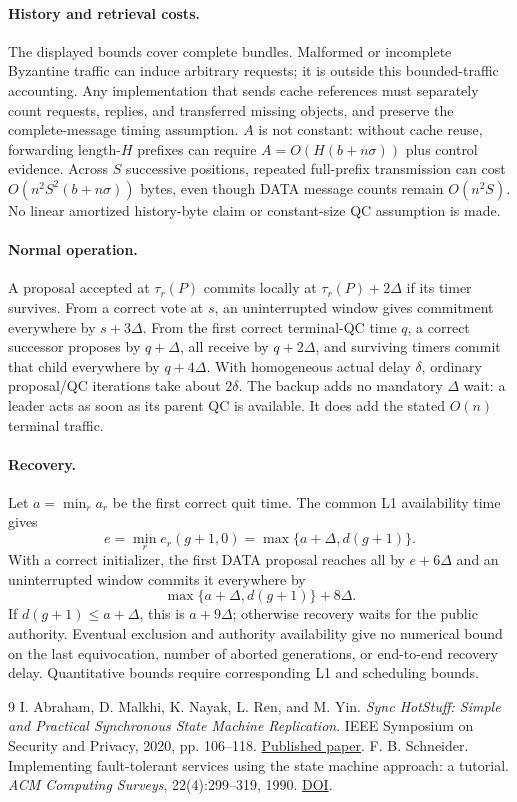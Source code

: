 \documentclass[11pt,a4paper]{article}
\begin{document}
\paragraph{History and retrieval costs.}
The displayed bounds cover complete bundles. Malformed or incomplete
Byzantine traffic can induce arbitrary requests; it is outside this
bounded-traffic accounting. Any implementation that sends cache references
must separately count requests, replies, and transferred missing objects,
and preserve the complete-message timing assumption. $A$ is not constant:
without cache reuse, forwarding length-$H$ prefixes can require
$A=O(H(b+n\sigma))$ plus control evidence. Across $S$ successive positions,
repeated full-prefix transmission can cost $O(n^2S^2(b+n\sigma))$ bytes,
even though DATA message counts remain $O(n^2S)$. No linear amortized
history-byte claim or constant-size QC assumption is made.

\paragraph{Normal operation.}
A proposal accepted at $\tau_r(P)$ commits locally at
$\tau_r(P)+2\Delta$ if its timer survives. From a correct vote at $s$,
an uninterrupted window gives commitment everywhere by $s+3\Delta$.
From the first correct terminal-QC time $q$, a correct successor proposes
by $q+\Delta$, all receive by $q+2\Delta$, and surviving timers commit
that child everywhere by $q+4\Delta$. With homogeneous actual delay
$\delta$, ordinary proposal/QC iterations take about $2\delta$.
The backup adds no mandatory $\Delta$ wait: a leader acts as soon as
its parent QC is available. It does add the stated $O(n)$ terminal traffic.

\paragraph{Recovery.}
Let $a=\min_r a_r$ be the first correct quit time. The common L1
availability time gives
\[
 e=\min_r e_r(g+1,0)=\max\{a+\Delta,d(g+1)\}.
\]
With a correct initializer, the first DATA proposal reaches all by
$e+6\Delta$ and an uninterrupted window commits it everywhere by
\[
 \max\{a+\Delta,d(g+1)\}+8\Delta.
\]
If $d(g+1)\le a+\Delta$, this is $a+9\Delta$; otherwise recovery
waits for the public authority. Eventual exclusion and
authority availability give no numerical bound on the last equivocation,
number of aborted generations, or end-to-end recovery delay. Quantitative
bounds require corresponding L1 and scheduling bounds.



\begin{thebibliography}{9}
I. Abraham, D. Malkhi, K. Nayak, L. Ren, and M. Yin.
\emph{Sync HotStuff: Simple and Practical Synchronous State Machine Replication}.
IEEE Symposium on Security and Privacy, 2020, pp. 106--118.
\href{https://conferences.computer.org/sp/pdfs/sp/2020/349700a106.pdf}{Published paper}.
F. B. Schneider. Implementing fault-tolerant services using the state machine
approach: a tutorial. \emph{ACM Computing Surveys}, 22(4):299--319, 1990.
\href{https://doi.org/10.1145/98163.98167}{DOI}.
\end{thebibliography}
\end{document}
